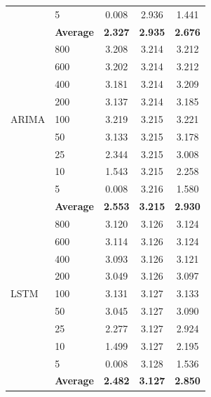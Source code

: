 \documentclass[11pt,a4paper]{article}
\begin{document}
\begin{table}[H]
\begin{tabular}{llccc}
 & 5   & 0.008 & 2.936 & 1.441 \\
 & \textbf{Average} & \textbf{2.327} & \textbf{2.935} & \textbf{2.676} \\
\midrule
\multirow{9}{*}{ARIMA}
 & 800 & 3.208 & 3.214 & 3.212 \\
 & 600 & 3.202 & 3.214 & 3.212 \\
 & 400 & 3.181 & 3.214 & 3.209 \\
 & 200 & 3.137 & 3.214 & 3.185 \\
 & 100 & 3.219 & 3.215 & 3.221 \\
 & 50  & 3.133 & 3.215 & 3.178 \\
 & 25  & 2.344 & 3.215 & 3.008 \\
 & 10  & 1.543 & 3.215 & 2.258 \\
 & 5   & 0.008 & 3.216 & 1.580 \\
 & \textbf{Average} & \textbf{2.553} & \textbf{3.215} & \textbf{2.930} \\
\midrule
\multirow{9}{*}{LSTM}
 & 800 & 3.120 & 3.126 & 3.124 \\
 & 600 & 3.114 & 3.126 & 3.124 \\
 & 400 & 3.093 & 3.126 & 3.121 \\
 & 200 & 3.049 & 3.126 & 3.097 \\
 & 100 & 3.131 & 3.127 & 3.133 \\
 & 50  & 3.045 & 3.127 & 3.090 \\
 & 25  & 2.277 & 3.127 & 2.924 \\
 & 10  & 1.499 & 3.127 & 2.195 \\
 & 5   & 0.008 & 3.128 & 1.536 \\
 & \textbf{Average} & \textbf{2.482} & \textbf{3.127} & \textbf{2.850} \\
\bottomrule
\end{tabular}
\end{table}
\end{document}
